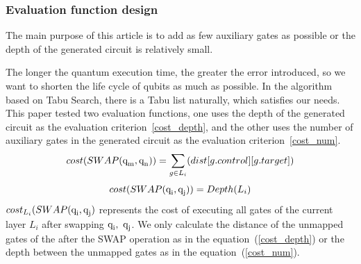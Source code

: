 \documentclass[runningheads]{llncs}
\begin{document}
\subsubsection{Evaluation function design }
The main purpose of this article is to add as few auxiliary gates as possible or the depth of the generated circuit is relatively small.

The longer the quantum execution time, the greater the error introduced, so we want to shorten the life cycle of qubits as much as possible. In the algorithm based on Tabu Search, there is a Tabu list naturally, which satisfies our needs. This paper tested two evaluation functions, one uses the depth of the generated circuit as the evaluation criterion~\ref{cost_depth}, and the other uses the number of auxiliary gates in the generated circuit as the evaluation criterion~\ref{cost_num}.
\begin{equation}
	cost(SWAP(\textup{q}_\textup{m},\textup{q}_\textup{n}))= \sum_{g \in L_{i}}(dist[g.control][g.target])
	\label{cost_num}
	\end{equation}
	\begin{equation}
		cost(SWAP(\textup{q}_\textup{i},\textup{q}_\textup{j}))= Depth(L_{i})
		\label{cost_depth}
		\end{equation}
$cost_{L_i}(SWAP(\textup{q}_\textup{i},\textup{q}_\textup{j})$ represents the cost of executing all gates of the current layer $L_i$ 
after swapping $\textup{q}_\textup{i}, \ \textup{q}_\textup{j}$. We only calculate the distance of the unmapped gates of the after the SWAP operation as in the equation~(\ref{cost_depth}) or the depth between the unmapped gates as in the equation~(\ref{cost_num}).
\end{document}
